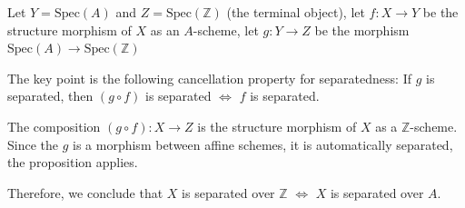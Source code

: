 Let $Y=\text{Spec}(A)$ and $Z = \text{Spec}(\mathbb{Z})$ (the terminal object), let $f: X \to Y$ be the structure morphism of $X$ as an $A$-scheme, let $g: Y \to Z$ be the morphism $\text{Spec}(A) \to \text{Spec}(\mathbb{Z})$

The key point is the following cancellation property for separatedness: If $g$ is separated, then $(g \circ f)$ is separated $\iff$ $f$ is separated.

The composition $(g \circ f): X \to Z$ is the structure morphism of $X$ as a $\mathbb{Z}$-scheme. Since the $g$ is a morphism between affine schemes, it is automatically separated, the proposition applies.

Therefore, we conclude that $X$ is separated over $\mathbb{Z}$ $\iff$ $X$ is separated over $A$.